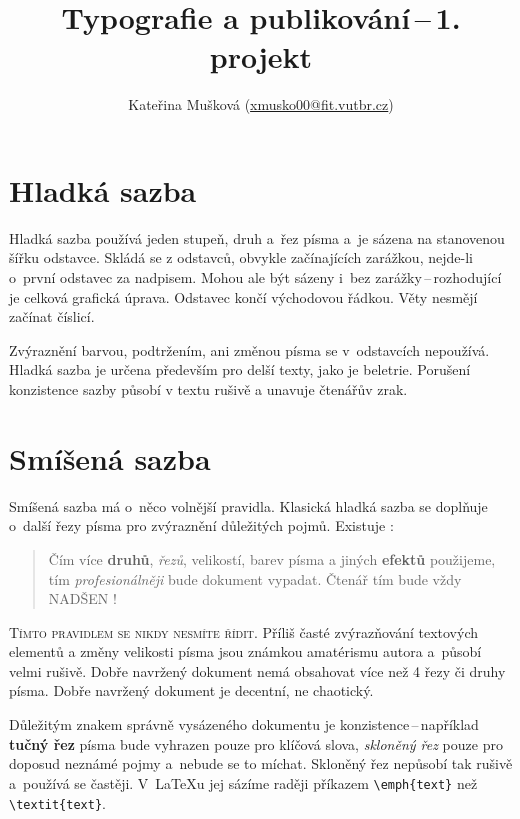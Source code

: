 \documentclass[10pt, a4paper, twocolumn]{article}
\title{Typografie a publikování\,--\,1. projekt}
\author{Kateřina Mušková (\url{xmusko00@fit.vutbr.cz})}
\date{}
\begin{document}
\maketitle

\section{Hladká sazba}

Hladká sazba používá jeden stupeň, druh a~řez písma a~je sázena na stanovenou šířku odstavce. Skládá se z od\-stavců, obvykle začínajících zarážkou, nejde-li o~první od\-stavec za nadpisem. Mohou ale být sázeny i~bez zarážky\,--\,rozhodující je celková grafická úprava. Odstavec končí vý\-chodovou řádkou. Věty nesmějí začínat číslicí.

Zvýraznění barvou, podtržením, ani změnou písma se v~odstavcích nepoužívá. Hladká sazba je určena především pro delší texty, jako je beletrie. Porušení konzistence sazby působí v textu ru\-šivě a unavuje čtenářův zrak.

\section{Smíšená sazba}\label{sec:SmSa}

Smíšená sazba má o~něco volnější pravidla. Klasická hladká sazba se doplňuje o~další řezy písma pro zvýraznění dů\-ležitých pojmů. Existuje :

\begin{quote}
Čím více \textbf{druhů}, \textit{řezů}, {\scriptsize velikostí}, barev písma a ji\-ný\-ch \textbf{\tiny efektů} použijeme, tím \emph{profesionálněji} bude dokument vypadat. Čtenář tím bude {\Large vždy} 
{\huge NADŠEN} {\Huge!}
\end{quote}

\textsc{Tímto pravidlem se nikdy nesmíte řídit.} Příliš časté zvýrazňování textových elementů a změny velikosti písma jsou známkou amatérismu autora a~působí velmi ru\-šivě. Dobře navržený dokument nemá obsahovat více než
4 řezy či druhy písma. Dobře navržený dokument je decentní, ne chaotický.

Důležitým znakem správně vysázeného dokumentu je konzistence\,--\,například \textbf{tučný řez} písma bude vyhrazen pouze pro klíčová slova, \emph{skloněný řez} pouze pro doposud neznámé pojmy a~nebude se to míchat. Skloněný řez nepůsobí tak rušivě a~používá se častěji. V~\LaTeX u jej sázíme raději příkazem \texttt{\textbackslash emph\{text\}} než \texttt{ \textbackslash textit\{text\}}.
\end{document}
